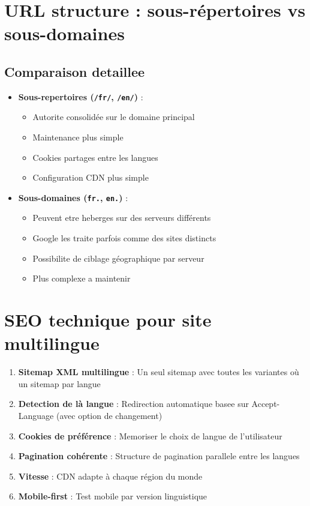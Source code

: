 \documentclass[12pt,a4paper,twoside]{report}
\begin{document}
\section{URL structure : sous-répertoires vs sous-domaines}

\subsection{Comparaison detaillee}

\begin{itemize}
    \item \textbf{Sous-repertoires (\texttt{/fr/}, \texttt{/en/})} :
    \begin{itemize}
        \item Autorite consolidée sur le domaine principal
        \item Maintenance plus simple
        \item Cookies partages entre les langues
        \item Configuration CDN plus simple
    \end{itemize}
    \item \textbf{Sous-domaines (\texttt{fr.}, \texttt{en.})} :
    \begin{itemize}
        \item Peuvent etre heberges sur des serveurs différents
        \item Google les traite parfois comme des sites distincts
        \item Possibilite de ciblage géographique par serveur
        \item Plus complexe a maintenir
    \end{itemize}
\end{itemize}

\section{SEO technique pour site multilingue}

\begin{enumerate}
    \item \textbf{Sitemap XML multilingue} : Un seul sitemap avec toutes les variantes où un sitemap par langue
    \item \textbf{Detection de là langue} : Redirection automatique basee sur Accept-Language (avec option de changement)
    \item \textbf{Cookies de préférence} : Memoriser le choix de langue de l'utilisateur
    \item \textbf{Pagination cohérente} : Structure de pagination parallele entre les langues
    \item \textbf{Vitesse} : CDN adapte à chaque région du monde
    \item \textbf{Mobile-first} : Test mobile par version linguistique
\end{enumerate}
\end{document}
